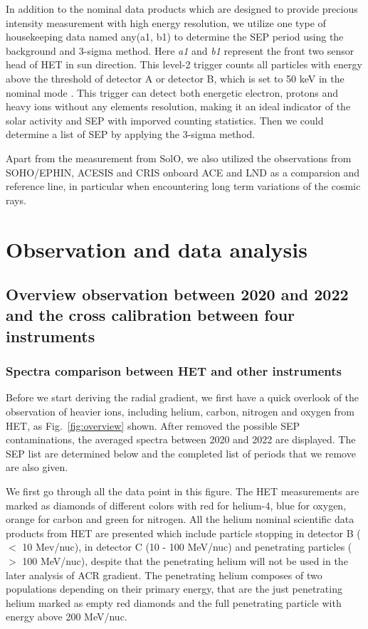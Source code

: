 In addition to the nominal data products which are designed to provide precious intensity measurement with high energy resolution, we utilize one type of housekeeping data named any(a1, b1) to determine the \ac{SEP} period using the background and 3-sigma method. Here \textit{a1} and \textit{b1} represent the front two sensor head of \ac{HET} in sun direction. This level-2 trigger counts all  particles with energy above the threshold of detector A or detector B, which is set to 50 keV in the nominal mode \citep{Elftmann-2020-PhD}. This trigger can detect both energetic electron, protons and heavy ions without any elements resolution, making it an ideal indicator of the solar activity and \ac{SEP} with imporved counting statistics. Then we could determine a list of \ac{SEP} by applying the 3-sigma method.

Apart from the measurement from \ac{SolO}, we also utilized the observations from \ac{SOHO}/\ac{EPHIN}, \ac{ACESIS} and \ac{CRIS} onboard \ac{ACE} and \ac{LND} as a comparsion and reference line, in particular when encountering long term variations of the cosmic rays.

\section{Observation and data analysis}

\subsection{Overview observation between 2020 and 2022 and the cross calibration between four instruments}

\subsubsection{Spectra comparison between \ac{HET} and other instruments}

Before we start deriving the radial gradient, we first have a quick overlook of the observation of heavier ions, including helium, carbon, nitrogen and oxygen from \ac{HET}, as Fig.~\ref{fig:overview} shown. After removed the possible \ac{SEP} contaminations, the averaged spectra between 2020 and 2022 are displayed. The \ac{SEP} list are determined below and the completed list of periods that we remove are also given.

We first go through all the data point in this figure.
The \ac{HET} measurements are marked as diamonds of different colors with red for helium-4, blue for oxygen, orange for carbon and green for nitrogen.
All the helium nominal scientific data products from \ac{HET} are presented which include particle stopping in detector B ($<$ 10 Mev/nuc), in detector C (10 - 100 MeV/nuc) and penetrating particles ($>$ 100 MeV/nuc), despite that the penetrating helium will not be used in the later analysis of \ac{ACR} gradient.
The penetrating helium composes of two populations depending on their primary energy, that are the just penetrating helium marked as empty red diamonds and the full penetrating particle with energy above 200 MeV/nuc. 

